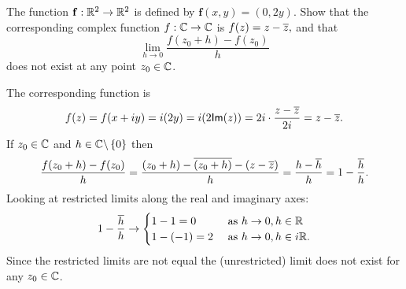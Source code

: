 \begin{questions}
\begin{answer}
\end{answer}
\question The function $\mathbf{f}: \mathbb{R}^2 \to \mathbb{R}^2$ is defined by
$
\mathbf{f} (x,y)=(0,2y).
$
Show that the corresponding complex function $f:\mathbb{C} \to \mathbb{C}$ is
$
f(z) = z- \overline{z},
$
and that
\[
\lim_{h \to 0} \frac{f(z_0+h)-f(z_0)}{h}
\]
does not exist at any point $z_0 \in \mathbb{C}$.
\begin{answer}
The corresponding function is
\[
f(z) = f(x+iy) = i(2y) = i ( 2 \textsf{Im} (z) ) = 2i \cdot \frac{z-\overline{z}}{2i} = z - \overline{z}.
\]
If $z_0 \in \mathbb{C}$ and $h \in \mathbb{C} \backslash \left\{0\right\}$ then
\[
\frac{f(z_0+h)-f(z_0)}{h} = \frac{(z_0+h)-\overline{(z_0+h)} - (z-\overline{z})}{h} = \frac{h-\overline{h}}{h} = 1- \frac{\overline{h}}{h}.
\]
Looking at restricted limits along the real and imaginary axes:
\[
1-\frac{\overline{h}}{h} \to \begin{cases}
1-1=0 & \text{ as } h \to 0, h \in \mathbb{R} \\
1-(-1)=2 & \text{ as } h \to 0, h \in i \mathbb{R}.
\end{cases}
\]
Since the restricted limits are not equal the (unrestricted) limit does not exist for any $z_0 \in \mathbb{C}$.


\end{answer}
\end{questions}
